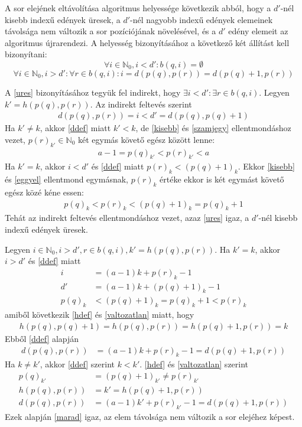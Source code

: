 A sor elejének eltávolítása algoritmus helyessége következik abból, hogy a $d'$-nél kisebb indexű edények üresek, a $d'$-nél nagyobb indexű edények elemeinek távolsága nem változik a sor pozíciójának növelésével, és a $d'$ edény elemeit az algoritmus újrarendezi.
A helyesség bizonyításához a következő két állítást kell bizonyítani:
\begin{equation}
\label{ures}
\forall i \in \mathbb{N}_0, i<d': b(q, i) = \emptyset
\end{equation}
\begin{equation}
\label{marad}
\forall i \in \mathbb{N}_0, i>d': \forall r \in b(q, i) : i = d(p(q), p(r)) = d(p(q)+1, p(r))
\end{equation}

A \eqref{ures} bizonyításához tegyük fel indirekt, hogy $\exists i < d': \exists r \in b(q, i)$.
Legyen $k'=h(p(q), p(r))$. Az indirekt feltevés szerint
\begin{align*}
d(p(q), p(r)) = i < d' = d(p(q), p(q)+1)
\end{align*}
Ha $k' \not = k$, akkor \eqref{ddef} miatt $k' < k$, de \eqref{kisebb} és \eqref{szamjegy} ellentmondáshoz vezet, $p(r)_{k'} \in \mathbb{N}_0$ két egymás követő egész között lenne:
\begin{align*}
a-1 = p(q)_{k'} < p(r)_{k'} < a
\end{align*}
Ha $k' = k$, akkor $i < d'$ és \eqref{ddef} miatt $p(r)_k < (p(q)+1)_k$. Ekkor \eqref{kisebb} és \eqref{eggyel} ellentmond egymásnak, $p(r)_k$ értéke ekkor is két egymást követő egész közé kéne essen:
\begin{align*}
p(q)_k < p(r)_k < (p(q)+1)_k = p(q)_k + 1
\end{align*}
Tehát az indirekt feltevés ellentmondáshoz vezet, azaz \eqref{ures} igaz, a $d'$-nél kisebb indexű edények üresek.

Legyen $i \in \mathbb{N}_0, i>d', r \in b(q, i), k'=h(p(q), p(r))$.
Ha $k' = k$, akkor $i>d'$ és \eqref{ddef} miatt
\begin{align*}
i &= (a-1)k+p(r)_k-1 \\
d' &= (a-1)k+(p(q)+1)_k-1 \\
p(q)_k &< (p(q)+1)_k = p(q)_k+1 < p(r)_k
\end{align*}
amiből következik \eqref{hdef} és \eqref{valtozatlan} miatt, hogy
\begin{align*}
h(p(q), p(q)+1) = h(p(q), p(r)) = h(p(q)+1, p(r)) = k
\end{align*}
Ebből \eqref{ddef} alapján
\begin{align*}
d(p(q), p(r)) &= (a-1)k+p(r)_{k}-1 = d(p(q)+1, p(r))
\end{align*}
Ha $k \not = k'$, akkor \ref{ddef} szerint $k < k'$.
\eqref{hdef} és \eqref{valtozatlan} szerint
\begin{align*}
p(q)_{k'} &= (p(q)+1)_{k'} \not= p(r)_{k'} \\
h(p(q), p(r)) &= k' = h(p(q)+1, p(r)) \\
d(p(q), p(r)) &= (a-1)k'+p(r)_{k'}-1=d(p(q)+1, p(r))
\end{align*}
Ezek alapján \ref{marad} igaz, az elem távolsága nem változik a sor elejéhez képest.

